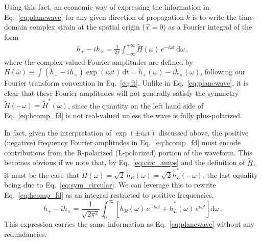 \documentclass[aps,prd,twocolumn,superscriptaddress,preprintnumbers,floatfix,nofootinbib]{revtex4-2}
\newcommand{\infd}{\mathrm{d}}
\begin{document}
Using this fact, an economic way of expressing the information in Eq.~\eqref{eq:planewave} for any given direction of propagation $\hat{k}$ is to write the time-domain complex strain at the spatial origin ($\vec{x}=0$) as a Fourier integral of the form
\begin{align} \label{eq:hcomp_fd}
h_+ - i h_\times = \frac{1}{2\pi} \int_{-\infty}^{+\infty} \tilde{H}(\omega)\, e^{-i \omega t} \,\infd \omega \, ,
\end{align}
where the complex-valued Fourier amplitudes are defined by $\tilde{H}(\omega) \equiv \int (h_+ - i h_\times) \exp(i\omega t)\, \infd t = \tilde{h}_+(\omega) - i \tilde{h}_\times(\omega)$, following our Fourier transform convention in Eq.~\eqref{eq:ft}.
Unlike in Eq.~\eqref{eq:planewave}, it is clear that these Fourier amplitudes will not generally satisfy the symmetry $\tilde{H}(-\omega) = \tilde{H}^*(\omega)$, since the quantity on the left hand side of Eq.~\eqref{eq:hcomp_fd} is not real-valued unless the wave is fully plus-polarized.

In fact, given the interpretation of $\exp(\pm i \omega t)$ discussed above, the positive (negative) frequency Fourier amplitudes in Eq.~\eqref{eq:hcomp_fd} must encode contributions from the R-polarized (L-polarized) portion of the waveform.
This becomes obvious if we note that, by Eq.~\eqref{eq:circ_amps} and the definition of $\tilde{H}$, it must be the case that $\tilde{H}(\omega) = \sqrt{2}\, \tilde{h}_R (\omega) = \sqrt{2} \tilde{h}_L^*(-\omega)$, the last equality being due to Eq.~\eqref{eq:sym_circular}.
We can leverage this to rewrite Eq.~\eqref{eq:hcomp_fd} as an integral restricted to positive frequencies,
\begin{equation} \label{eq:hcomp_fd_rl}
h_+ - i h_\times = \frac{1}{\sqrt{2\pi^2}} \int_{0}^{\infty} \left[ \tilde{h}_R(\omega)\, e^{-i \omega t} + \tilde{h}_L^*(\omega)\, e^{i \omega t}\right] \infd \omega \, .
\end{equation}
This expression carries the same information as Eq.~\eqref{eq:planewave} without any redundancies.
\end{document}
